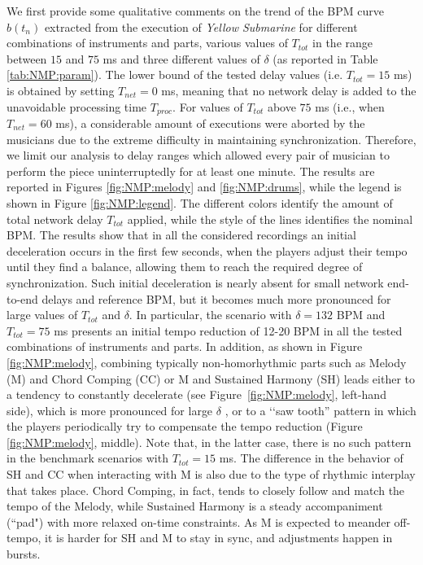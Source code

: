 We first provide some qualitative comments on the trend of the BPM curve $b(t_n)$ extracted from the execution of \textit{ Yellow Submarine} for different combinations of instruments and parts, various values of $T_{tot}$ in the range between $15$ and $75$ ms and three different values of $\delta$ (as reported in Table \ref{tab:NMP:param}). The lower bound of the tested delay values (i.e. $T_{tot}=15$ ms) is obtained by setting $T_{net}=0$ ms, meaning that no network delay is added to the unavoidable processing time $T_{proc}$. For values of $T_{tot}$ above $75$ ms (i.e., when $T_{net}=60$ ms), a considerable amount of executions were aborted by the musicians due to the extreme difficulty in maintaining synchronization. Therefore, we limit our analysis to delay ranges which allowed every pair of musician to perform the piece uninterruptedly for at least one minute.
The results are reported in Figures \ref{fig:NMP:melody} and \ref{fig:NMP:drums}, while the legend is shown in Figure  \ref{fig:NMP:legend}. The different colors identify the amount of total network delay $T_{tot}$ applied, while the style of the lines identifies the nominal BPM. The results show that in all the considered recordings an initial deceleration occurs in the first few seconds, when the players adjust their tempo until they find a balance, allowing them to reach the required degree of synchronization. Such initial deceleration is nearly absent for small network end-to-end delays and reference BPM, but it becomes much more pronounced for large values of $T_{tot}$ and $\delta$. In particular, the scenario with $\delta=132$ BPM and $T_{tot}=75$ ms presents an initial tempo reduction of 12-20 BPM in all the tested combinations of instruments and parts.
In addition, as shown in Figure \ref{fig:NMP:melody}, combining typically non-homorhythmic parts such as Melody (M) and Chord Comping (CC) or M and Sustained Harmony (SH) leads either to a tendency to constantly decelerate (see Figure~\ref{fig:NMP:melody}, left-hand side), which is more pronounced for large $\delta$ , or to a \lq\lq saw tooth'' pattern in which the players periodically try to compensate the tempo reduction (Figure \ref{fig:NMP:melody}, middle). Note that, in the latter case, there is no such pattern in the benchmark scenarios with $T_{tot}=15$ ms. The difference in the behavior of SH and CC when interacting with M is also due to the type of rhythmic interplay that takes place. Chord Comping, in fact, tends to closely follow and match the tempo of the Melody, while Sustained Harmony is a steady accompaniment (``pad") with more relaxed on-time constraints. As M is expected to meander off-tempo, it is harder for SH and M to stay in sync, and adjustments happen in bursts.


